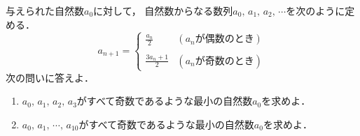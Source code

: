 \documentclass[../../main.tex]{subfiles}
\begin{document}
与えられた自然数$a_0$に対して，
自然数からなる数列$a_0, \, a_1, \, a_2, \, \cdots$を次のように定める．
\[ a_{n+1}=
  \begin{cases} \displaystyle\frac{a_n}{2} & (a_n\text{が偶数のとき}) \\ & \\
    \displaystyle\frac{3a_n+1}{2} & (a_n\text{が奇数のとき})
\end{cases} \]
次の問いに答えよ．
\begin{enumerate}
  \item$a_0, \, a_1, \, a_2, \, a_3$がすべて奇数であるような最小の自然数$a_0$を求めよ．
  \item$a_0, \, a_1, \, \cdots, \, a_{10}$がすべて奇数であるような最小の自然数$a_0$を求めよ．
\end{enumerate}
\end{document}
